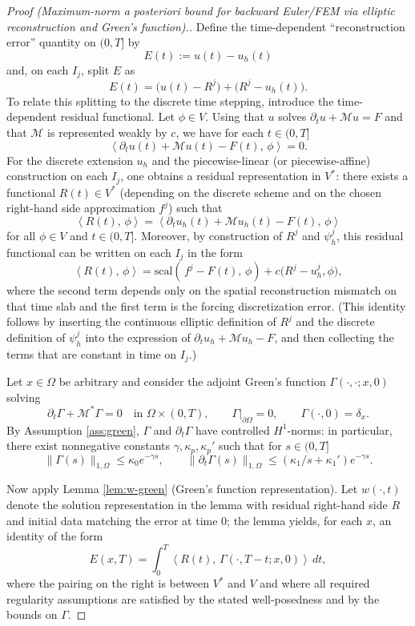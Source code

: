 \documentclass{article}
\newcommand{\dual}[2]{\left\langle #1,\,#2\right\rangle}
\begin{document}
\begin{proof}[Proof (Maximum-norm a posteriori bound for backward Euler/FEM via elliptic reconstruction and Green’s function).]
Define the time-dependent ``reconstruction error'' quantity on $(0,T]$ by
\[
E(t):=u(t)-u_h(t)
\]
and, on each $I_j$, split $E$ as
\[
E(t)=\bigl(u(t)-R^j\bigr)+\bigl(R^j-u_h(t)\bigr).
\]
To relate this splitting to the discrete time stepping, introduce the time-dependent residual functional. Let $\phi\in V$. Using that $u$ solves $\partial_t u+\mathcal{M}u=F$ and that $\mathcal{M}$ is represented weakly by $c$, we have for each $t\in(0,T]$
\[
\dual{\partial_t u(t)+\mathcal{M}u(t)-F(t)}{\phi}=0.
\]
For the discrete extension $u_h$ and the piecewise-linear (or piecewise-affine) construction on each $I_j$, one obtains a residual representation in $V^*$: there exists a functional $R(t)\in V^*$ (depending on the discrete scheme and on the chosen right-hand side approximation $f^j$) such that
\[
\dual{R(t)}{\phi}=\dual{\partial_t u_h(t)+\mathcal{M}u_h(t)-F(t)}{\phi}
\]
for all $\phi\in V$ and $t\in(0,T]$. Moreover, by construction of $R^j$ and $\psi_h^j$, this residual functional can be written on each $I_j$ in the form
\[
\dual{R(t)}{\phi}=\mathrm{scal}(\,f^j-F(t),\,\phi)+c\bigl(R^j-u_h^j,\phi\bigr),
\]
where the second term depends only on the spatial reconstruction mismatch on that time slab and the first term is the forcing discretization error. (This identity follows by inserting the continuous elliptic definition of $R^j$ and the discrete definition of $\psi_h^j$ into the expression of $\partial_t u_h+\mathcal{M}u_h-F$, and then collecting the terms that are constant in time on $I_j$.)

Let $x\in\Omega$ be arbitrary and consider the adjoint Green’s function $\Gamma(\cdot,\cdot;x,0)$ solving
\[
\partial_t \Gamma+\mathcal{M}^*\Gamma=0 \quad \text{in } \Omega\times(0,T),\qquad \Gamma|_{\partial\Omega}=0,\qquad \Gamma(\cdot,0)=\delta_x.
\]
By Assumption \ref{ass:green}, $\Gamma$ and $\partial_t \Gamma$ have controlled $H^1$-norms: in particular, there exist nonnegative constants $\gamma,\kappa_p,\kappa_p'$ such that for $s\in(0,T]$
\[
\|\Gamma(s)\|_{1,\Omega}\le \kappa_0 e^{-\gamma s},\qquad
\|\partial_t \Gamma(s)\|_{1,\Omega}\le (\kappa_1/s+\kappa_1')e^{-\gamma s}.
\]

Now apply Lemma \ref{lem:w-green} (Green’s function representation). Let $w(\cdot,t)$ denote the solution representation in the lemma with residual right-hand side $R$ and initial data matching the error at time $0$; the lemma yields, for each $x$, an identity of the form
\[
E(x,T)=\int_0^T \dual{R(t)}{\Gamma(\cdot,T-t;x,0)}\,dt,
\]
where the pairing on the right is between $V^*$ and $V$ and where all required regularity assumptions are satisfied by the stated well-posedness and by the bounds on $\Gamma$.


\end{proof}
\end{document}
